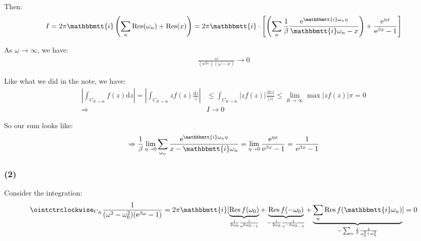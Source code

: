 \documentclass[]{ctexart}
\newcommand{\mi}{\mathbbmtt{i}}
\newcommand{\me}{\mathrm{e}}
\begin{document}
		Then: 
			\begin{equation*}
			\begin{aligned}
				I=2\pi \mi \left(\sum_{n}\operatorname{Res}(\omega_{n})+\operatorname{Res}(x)\right)=2 \pi \mi \cdot\left[\left(\sum_{n} \frac{1}{\beta} \frac{\me^{\mi \omega_{n} \eta}}{\mi \omega_{n}-x}\right)+\frac{\me^{\eta x}}{\me^{\beta x}-1}\right]
			\end{aligned}
			\end{equation*}
			
		As $\omega\to \infty$, we have:
			\begin{equation*}
			\begin{aligned}
				\frac{\omega}{(\me^{\beta\omega})(\omega-x)}\to 0
			\end{aligned}
			\end{equation*}
			
		Like what we did in the note, we have:
			\begin{equation*}
			\begin{aligned}
				\left|\int_{C_{R \rightarrow \infty}} f(z) \mathrm{d} z\right|=\left|\int_{C_{R \rightarrow \infty}} z f(z) \frac{\mathrm{d} z}{z}\right| &\leq \int_{C_{R \rightarrow \infty}}|z f(z)| \frac{|\mathrm{d} z|}{|z|} \leq \lim _{R \rightarrow \infty} \max |z f(z)| \pi=0\\
				\Rightarrow &I\to 0
			\end{aligned}
			\end{equation*}
			
		So our sum looks like:
			\begin{equation*}
			\begin{aligned}
				\Rightarrow \frac{1}{\beta} \lim _{\eta \rightarrow 0} \sum_{\omega_{n}} \frac{\me^{\mi \omega_{n} \eta}}{x-\mi \omega_{n}}=\lim _{\eta \rightarrow 0} \frac{\me^{\eta x}}{\me^{\beta x}-1}=\frac{1}{\me^{\beta x}-1}
			\end{aligned}
			\end{equation*}
			
		\subsubsection*{(2)}
			Consider the integration:
				\begin{equation*}
				\begin{aligned}
					\ointctrclockwise_{C_R}\frac{1}{(\omega^2-\omega_0^2)(\me^{\beta\omega}-1)}=2\pi \mi[\underbrace{\operatorname{Res}f(\omega_0)}_{\frac{1}{2\omega_0}\frac{1}{\me^{\beta\omega_0}-1}}+\underbrace{\operatorname{Res}f(-\omega_0)}_{-\frac{1}{2\omega_0}\frac{1}{\me^{-\beta\omega_0}-1}}+\underbrace{\sum_{n}\operatorname{Res}f(\mi \omega_{n})}_{-\sum_{n}\frac{1}{\beta}\frac{1}{\omega_0^2+\omega_{n}^2}}]=0
				\end{aligned}
				\end{equation*}
				
\end{document}
